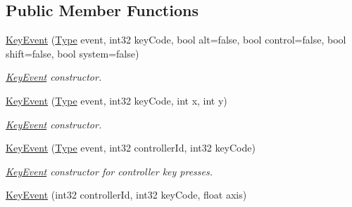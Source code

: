 \subsection*{Public Member Functions}
\begin{DoxyCompactItemize}
\item 
\mbox{\label{class_arcana_1_1_key_event_aaf2fd36768e5f3de12476fef5fa788d2}} 
\mbox{\hyperlink{class_arcana_1_1_key_event_aaf2fd36768e5f3de12476fef5fa788d2}{Key\+Event}} (\mbox{\hyperlink{class_arcana_1_1_key_event_a7e61abd92e372f41647951e8216a93e2}{Type}} event, int32 key\+Code, bool alt=false, bool control=false, bool shift=false, bool system=false)
\begin{DoxyCompactList}\small\item\em \mbox{\hyperlink{class_arcana_1_1_key_event}{Key\+Event}} constructor. \end{DoxyCompactList}\item 
\mbox{\label{class_arcana_1_1_key_event_a6478c87de863bbeb44386f602f6eceef}} 
\mbox{\hyperlink{class_arcana_1_1_key_event_a6478c87de863bbeb44386f602f6eceef}{Key\+Event}} (\mbox{\hyperlink{class_arcana_1_1_key_event_a7e61abd92e372f41647951e8216a93e2}{Type}} event, int32 key\+Code, int x, int y)
\begin{DoxyCompactList}\small\item\em \mbox{\hyperlink{class_arcana_1_1_key_event}{Key\+Event}} constructor. \end{DoxyCompactList}\item 
\mbox{\label{class_arcana_1_1_key_event_ade909059da54ebe593df14f80f1c9d54}} 
\mbox{\hyperlink{class_arcana_1_1_key_event_ade909059da54ebe593df14f80f1c9d54}{Key\+Event}} (\mbox{\hyperlink{class_arcana_1_1_key_event_a7e61abd92e372f41647951e8216a93e2}{Type}} event, int32 controller\+Id, int32 key\+Code)
\begin{DoxyCompactList}\small\item\em \mbox{\hyperlink{class_arcana_1_1_key_event}{Key\+Event}} constructor for controller key presses. \end{DoxyCompactList}\item 
\mbox{\label{class_arcana_1_1_key_event_a8af4057b5fba876cbee35c9f8901808e}} 
\mbox{\hyperlink{class_arcana_1_1_key_event_a8af4057b5fba876cbee35c9f8901808e}{Key\+Event}} (int32 controller\+Id, int32 key\+Code, float axis)

\end{DoxyCompactItemize}
